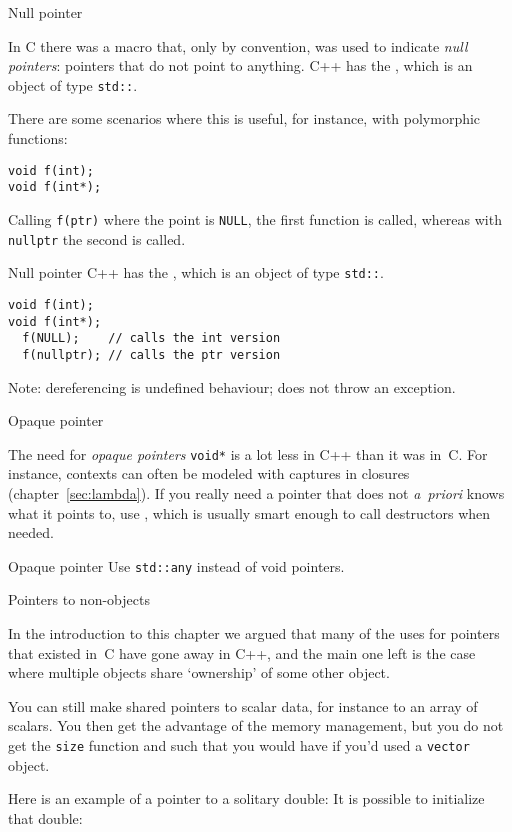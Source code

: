  {Null pointer}

In C there was a macro  that, only by convention, was
used to indicate
\emph{null pointers}:
pointers that do not point to anything.
C++ has the , which is an object of type
\lstinline{std::}.

There are some scenarios where this is useful, for instance, with
polymorphic functions:
\begin{lstlisting}
void f(int);
void f(int*);
\end{lstlisting}
Calling \lstinline{f(ptr)} where the point is \lstinline{NULL}, the first function is
called, whereas with \lstinline{nullptr} the second is called.

\begin{slide}{Null pointer}
  \label{sl:cpp-nullptr}
  C++ has the , which is an object of type
  \lstinline{std::}.

\begin{lstlisting}
void f(int);
void f(int*);
  f(NULL);    // calls the int version
  f(nullptr); // calls the ptr version
\end{lstlisting}
Note: dereferencing is undefined behaviour; does not throw an exception.
\end{slide}

 {Opaque pointer}

The need for \emph{opaque pointers}
\lstinline{void*}
is a lot less in C++ than it was in~C. For
instance, contexts can often be modeled with captures in closures
(chapter~\ref{sec:lambda}). If you really need a pointer that does not
\textit{a~priori} knows what it points to, use ,
which is usually smart enough to call destructors when needed.


\begin{slide}{Opaque pointer}
  \label{sl:void-ptr}
  Use \lstinline{std::any} instead of void pointers.

\end{slide}

 {Pointers to non-objects}

In the introduction to this chapter we argued that many of the uses
for pointers that existed in~C have gone away in C++, and the main one
left is the case where multiple objects share `ownership' of some
other object.

You can still make shared pointers to scalar data, for instance to an
array of scalars. You then get the advantage of the memory management,
but you do not get the \lstinline{size} function and such that you would have
if you'd used a \lstinline{vector} object.

Here is an example of a pointer to a solitary double:
%
%
It is possible to initialize that double:
%

